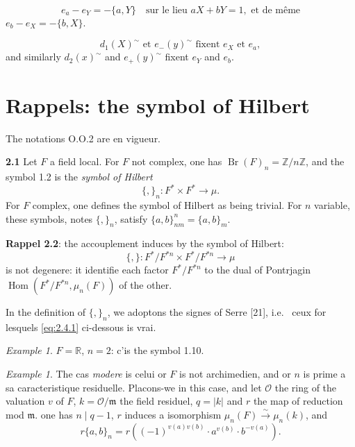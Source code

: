 \documentclass[12pt,a4paper]{article}
\theoremstyle{plain}
\theoremstyle{definition}
\theoremstyle{remark}
\newtheorem{example}[theorem]{Example}
\DeclareMathOperator{\Hom}{Hom}
\DeclareMathOperator{\Br}{Br}
\newcommand{\RR}{\mathbb{R}}
\newcommand{\ZZ}{\mathbb{Z}}
\newcommand{\cO}{\mathcal{O}}
\newcommand{\frakm}{\mathfrak{m}}
\providecommand{\RR}{\mathbb{R}}
\providecommand{\ZZ}{\mathbb{Z}}
\providecommand{\cO}{\mathcal{O}}
\providecommand{\frakm}{\mathfrak{m}}
\providecommand{\Hom}{\operatorname{Hom}}
\begin{document}
\begin{equation}\label{eq:1.14.2}
e_a - e_Y = -\{a, Y\} \quad \text{sur le lieu } aX + bY = 1, \text{ et de même}
\tag{1.14.2}
\end{equation}
$e_b - e_X = -\{b, X\}$.

\begin{equation}\label{eq:1.14.3}
d_1(X)^\sim \text{ et } e_-(y)^\sim \text{ fixent } e_X \text{ et } e_a,
\tag{1.14.3}
\end{equation}
and similarly $d_2(x)^\sim$ and $e_+(y)^\sim$ fixent $e_Y$ and $e_b$.


\section{Rappels: the symbol of Hilbert}

The notations O.O.2 are en vigueur.

\textbf{2.1} Let $F$ a field local. For $F$ not complex, one has $\Br(F)_n = \ZZ/n\ZZ$, and the symbol 1.2 is the \emph{symbol of Hilbert}
\[
\{,\}_n : F^* \times F^* \longrightarrow \mu.
\]
For $F$ complex, one defines the symbol of Hilbert as being trivial. For $n$ variable, these symbols, notes $\{,\}_n$, satisfy $\{a, b\}_{nm}^n = \{a, b\}_m$.

\textbf{Rappel 2.2}: the accouplement induces by the symbol of Hilbert:
\[
\{,\} : F^*/F^{*n} \times F^*/F^{*n} \longrightarrow \mu
\]
is not degenere: it identifie each factor $F^*/F^{*n}$ to the dual of Pontrjagin $\Hom(F^*/F^{*n}, \mu_n(F))$ of the other.

In the definition of $\{,\}_n$, we adoptons the signes of Serre [21], i.e.
\ ceux for lesquels \eqref{eq:2.4.1} ci-dessous is vrai.

\begin{example}
$F = \RR$, $n = 2$: c'is the symbol 1.10.
\end{example}

\begin{example}
The cas \emph{modere} is celui or $F$ is not archimedien, and or $n$ is prime a sa caracteristique residuelle. Placons-we in this case, and let $\cO$ the ring of the valuation $v$ of $F$, $k = \cO/\frakm$ the field residuel, $q = |k|$ and $r$ the map of reduction mod $\frakm$. one has $n \mid q - 1$, $r$ induces a isomorphism $\mu_n(F) \xrightarrow{\sim} \mu_n(k)$, and
\begin{equation}\label{eq:2.4.1}
r\{a, b\}_n = r\left((-1)^{v(a)v(b)} \cdot a^{v(b)} \cdot b^{-v(a)}\right).
\tag{2.4.1}
\end{equation}
\end{example}
\end{document}
